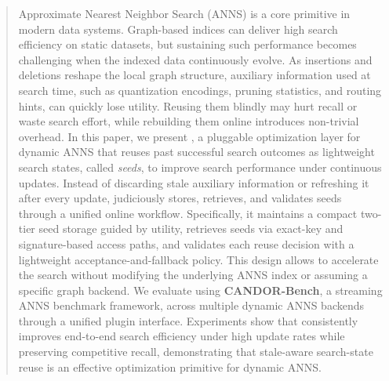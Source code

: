 \begin{abstract} 
Approximate Nearest Neighbor Search (ANNS) is a core primitive in modern data systems.
Graph-based indices can deliver high search efficiency on static datasets, but sustaining such performance becomes challenging when the indexed data continuously evolve. 
As insertions and deletions reshape the local graph structure, auxiliary information used at search time, such as quantization encodings, pruning statistics, and routing hints, can quickly lose utility. Reusing them blindly may hurt recall or waste search effort, while rebuilding them online introduces non-trivial overhead. In this paper, we present \system, a pluggable optimization layer for dynamic ANNS that reuses past successful search outcomes as lightweight search states, called \textit{seeds}, to improve search performance under continuous updates. Instead of discarding stale auxiliary information or refreshing it after every update, \system judiciously stores, retrieves, and validates seeds through a unified online workflow. Specifically, it maintains a compact two-tier seed storage guided by utility, retrieves seeds via exact-key and signature-based access paths, and validates each reuse decision with a lightweight acceptance-and-fallback policy. This design allows \system to accelerate the search without modifying the underlying ANNS index or assuming a specific graph backend. We evaluate \system using \textbf{CANDOR-Bench}, a streaming ANNS benchmark framework, across multiple dynamic ANNS backends through a unified plugin interface. Experiments show that \system consistently improves end-to-end search efficiency under high update rates while preserving competitive recall, demonstrating that stale-aware search-state reuse is an effective optimization primitive for dynamic ANNS. 
\end{abstract}